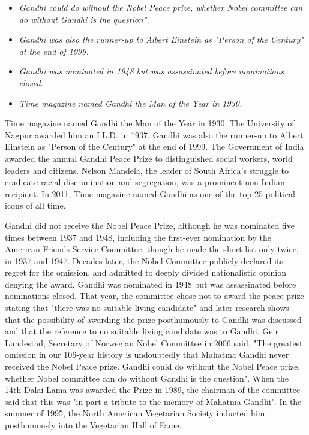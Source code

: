 \begin{itemize}
\item
  \emph{Gandhi could do without the Nobel Peace prize, whether Nobel
  committee can do without Gandhi is the question".}
\item
  \emph{Gandhi was also the runner-up to Albert Einstein as "Person of
  the Century" at the end of 1999.}
\item
  \emph{Gandhi was nominated in 1948 but was assassinated before
  nominations closed.}
\item
  \emph{Time magazine named Gandhi the Man of the Year in 1930.}
\end{itemize}

Time magazine named Gandhi the Man of the Year in 1930. The University
of Nagpur awarded him an LL.D. in 1937. Gandhi was also the runner-up to
Albert Einstein as "Person of the Century" at the end of 1999. The
Government of India awarded the annual Gandhi Peace Prize to
distinguished social workers, world leaders and citizens. Nelson
Mandela, the leader of South Africa's struggle to eradicate racial
discrimination and segregation, was a prominent non-Indian recipient. In
2011, Time magazine named Gandhi as one of the top 25 political icons of
all time.

Gandhi did not receive the Nobel Peace Prize, although he was nominated
five times between 1937 and 1948, including the first-ever nomination by
the American Friends Service Committee, though he made the short list
only twice, in 1937 and 1947. Decades later, the Nobel Committee
publicly declared its regret for the omission, and admitted to deeply
divided nationalistic opinion denying the award. Gandhi was nominated in
1948 but was assassinated before nominations closed. That year, the
committee chose not to award the peace prize stating that "there was no
suitable living candidate" and later research shows that the possibility
of awarding the prize posthumously to Gandhi was discussed and that the
reference to no suitable living candidate was to Gandhi. Geir Lundestad,
Secretary of Norwegian Nobel Committee in 2006 said, "The greatest
omission in our 106-year history is undoubtedly that Mahatma Gandhi
never received the Nobel Peace prize. Gandhi could do without the Nobel
Peace prize, whether Nobel committee can do without Gandhi is the
question". When the 14th Dalai Lama was awarded the Prize in 1989, the
chairman of the committee said that this was "in part a tribute to the
memory of Mahatma Gandhi". In the summer of 1995, the North American
Vegetarian Society inducted him posthumously into the Vegetarian Hall of
Fame.


